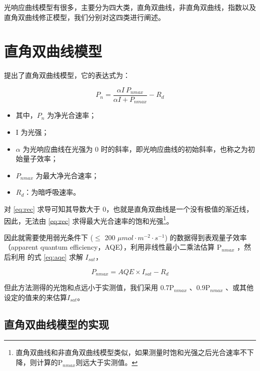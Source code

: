 \documentclass[
]{krantz}
\providecommand{\tightlist}{%
  \setlength{\itemsep}{0pt}\setlength{\parskip}{0pt}}
\begin{document}
光响应曲线模型有很多，主要分为四大类，直角双曲线，非直角双曲线，指数以及直角双曲线修正模型，我们分别对这四类进行阐述。

\hypertarget{rec_mod}{%
\section{直角双曲线模型}\label{rec_mod}}

\citet{BalyEC1935} 提出了直角双曲线模型，它的表达式为：

\begin{equation}
P_{n}  = \frac{\alpha I\ P_{nmax}}{\alpha I + P_{nmax}}- R_{d}
\label{eq:rec}
\end{equation}

\begin{itemize}
\tightlist
\item
  其中，\(P_{n}\) 为净光合速率；
\item
  I 为光强；
\item
  \(\alpha\) 为光响应曲线在光强为 0 时的斜率，即光响应曲线的初始斜率，也称之为初始量子效率；
\item
  \(P_{nmax}\) 为最大净光合速率；
\item
  \(R_{d}\)：为暗呼吸速率。
\end{itemize}

对 \eqref{eq:rec} 求导可知其导数大于 0，也就是直角双曲线是一个没有极值的渐近线，因此，无法由 \eqref{eq:rec} 求得最大光合速率的饱和光强\footnote{直角双曲线和非直角双曲线模型类似，如果测量时饱和光强之后光合速率不下降，则计算的P\(_{nmax}\)则远大于实测值。}。

因此就需要使用弱光条件下
(\(\leq\) 200 \(\mu mol\cdot m^{-2}\cdot s^{-1}\)) 的数据得到表观量子效率（apparent
quantum efficiency，AQE），利用非线性最小二乘法估算 P\(_{nmax}\) ，然后利用 \citet{YEZiPiao2010} 的式 \eqref{eq:aqe} 求解 \(I_{sat}\)，

\begin{equation}
P_{nmax}= AQE \times I_{sat} - R_{d}
\label{eq:aqe}
\end{equation}

但此方法测得的光饱和点远小于实测值，我们采用 0.7P\(_{nmax}\) \citet{ZhangXS2009}、0.9P\(_{nmax}\)
\citet{HuangHY2009}、或其他设定的值来的来估算\(I_{sat}\)。

\hypertarget{rec_fit}{%
\subsection{直角双曲线模型的实现}\label{rec_fit}}
\end{document}
